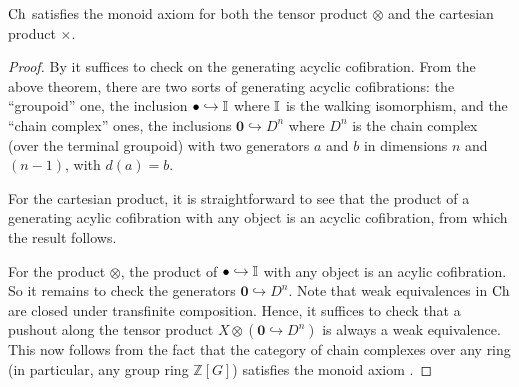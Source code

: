 \documentclass[12pt]{amsart}
\begin{document}
\begin{theorem}\label{lem:chgpd-monoid-axiom}
	${\mathrm{Ch}}$ satisfies the monoid axiom for both the tensor product $\otimes$ and the cartesian product $\times$. 
\end{theorem}
\begin{proof}
	By \cite[Lemma 2.3]{SchwedeShipley1998} it suffices to check on the generating acyclic cofibration. From the above theorem, there are two sorts of generating acyclic cofibrations: the ``groupoid'' one, the inclusion $\bullet \hookrightarrow \mathbb{I}$ where $\mathbb{I}$ is the walking isomorphism, and the ``chain complex'' ones, the inclusions $\mathbf{0} \hookrightarrow D^n$ where $D^n$ is the chain complex (over the terminal groupoid) with two generators $a$ and $b$ in dimensions $n$ and $(n-1)$, with $d(a) = b$. 
	\par 
	For the cartesian product, it is straightforward to see that the product of a generating acylic cofibration with any object is an acyclic cofibration, from which the result follows. 
	\par 
	For the product $\otimes$, the product of $\bullet \hookrightarrow \mathbb{I}$ with any object is an acylic cofibration. So it remains to check the generators $\mathbf{0} \hookrightarrow D^n$. 
	Note that weak equivalences in ${\mathrm{Ch}}$ are closed under transfinite composition. 
	Hence, it suffices to check that a pushout along the tensor product $X \otimes (\mathbf{0} \hookrightarrow D^n)$ is always a weak equivalence. 
	This now follows from the fact that the category of chain complexes over any ring (in particular, any group ring $\mathbb{Z}[G]$) satisfies the monoid axiom \cite[Section 4]{SchwedeShipley1998}.
\end{proof}
\end{document}
